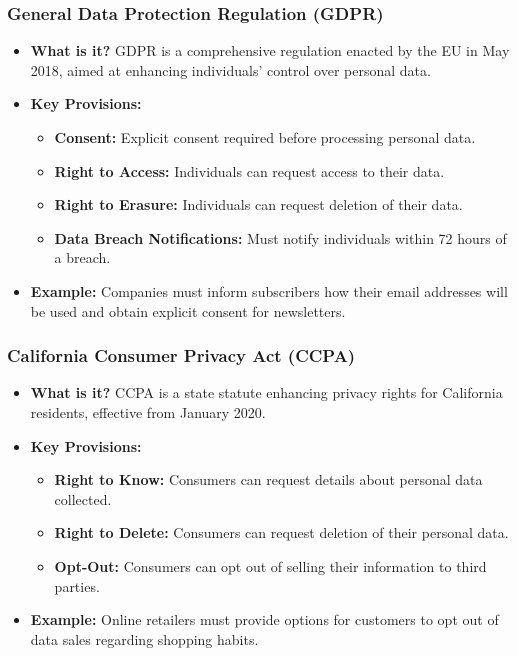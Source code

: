 \documentclass{beamer}
\begin{document}
\begin{frame}[fragile]
    \frametitle{General Data Protection Regulation (GDPR)}
    \begin{itemize}
        \item \textbf{What is it?} GDPR is a comprehensive regulation enacted by the EU in May 2018, aimed at enhancing individuals' control over personal data.
        
        \item \textbf{Key Provisions:}
        \begin{itemize}
            \item \textbf{Consent:} Explicit consent required before processing personal data.
            \item \textbf{Right to Access:} Individuals can request access to their data.
            \item \textbf{Right to Erasure:} Individuals can request deletion of their data.
            \item \textbf{Data Breach Notifications:} Must notify individuals within 72 hours of a breach.
        \end{itemize}
        
        \item \textbf{Example:} Companies must inform subscribers how their email addresses will be used and obtain explicit consent for newsletters.
    \end{itemize}
\end{frame}

\begin{frame}[fragile]
    \frametitle{California Consumer Privacy Act (CCPA)}
    \begin{itemize}
        \item \textbf{What is it?} CCPA is a state statute enhancing privacy rights for California residents, effective from January 2020.
        
        \item \textbf{Key Provisions:}
        \begin{itemize}
            \item \textbf{Right to Know:} Consumers can request details about personal data collected.
            \item \textbf{Right to Delete:} Consumers can request deletion of their personal data.
            \item \textbf{Opt-Out:} Consumers can opt out of selling their information to third parties.
        \end{itemize}
        
        \item \textbf{Example:} Online retailers must provide options for customers to opt out of data sales regarding shopping habits.
    \end{itemize}
\end{frame}
\end{document}
